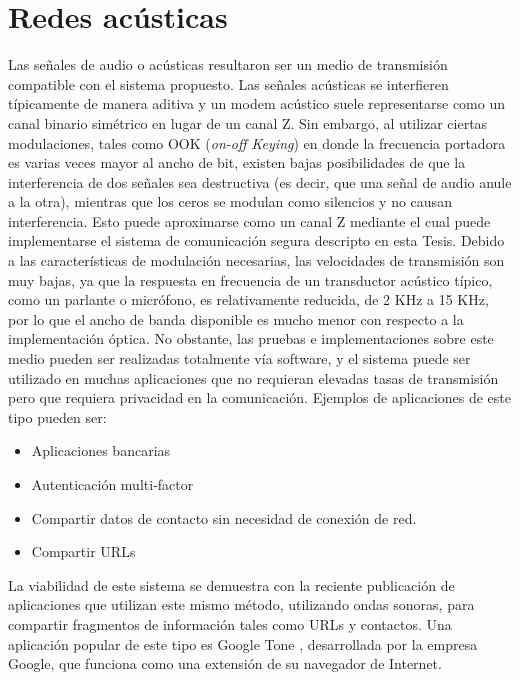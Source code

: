 \section{Redes acústicas}
\label{redacus}

Las señales de audio o acústicas resultaron ser un medio de transmisión compatible con el sistema propuesto. Las señales acústicas se interfieren típicamente de manera aditiva y un modem acústico suele representarse como un canal binario simétrico en lugar de un canal Z. Sin embargo, al utilizar ciertas modulaciones, tales como OOK (\textit{on-off Keying}) en donde la frecuencia portadora es varias veces mayor al ancho de bit, existen bajas posibilidades de que la interferencia de dos señales sea destructiva (es decir, que una señal de audio anule a la otra), mientras que los ceros se modulan como silencios y no causan interferencia. Esto puede aproximarse como un canal Z mediante el cual puede implementarse el sistema de comunicación segura descripto en esta Tesis. Debido a las características de modulación necesarias, las velocidades de transmisión son muy bajas, ya que la respuesta en frecuencia de un transductor acústico típico, como un parlante o micrófono, es relativamente reducida, de 2 KHz a 15 KHz, por lo que el ancho de banda disponible es mucho menor con respecto a la implementación óptica.
No obstante, las pruebas e implementaciones sobre este medio pueden ser realizadas totalmente vía software, y el sistema puede ser utilizado en muchas aplicaciones que no requieran elevadas tasas de transmisión pero que requiera privacidad en la comunicación. Ejemplos de aplicaciones de este tipo pueden ser:
\begin{itemize}
 \item Aplicaciones bancarias
 \item Autenticación multi-factor
 \item Compartir datos de contacto sin necesidad de conexión de red.
 \item Compartir URLs
\end{itemize}

La viabilidad de este sistema se demuestra con la reciente publicación de aplicaciones que utilizan este mismo método, utilizando ondas sonoras, para compartir fragmentos de información tales como URLs y contactos. Una aplicación popular de este tipo es Google Tone \cite{GoogleTone}, desarrollada por la empresa Google, que funciona como una extensión de su navegador de Internet.

